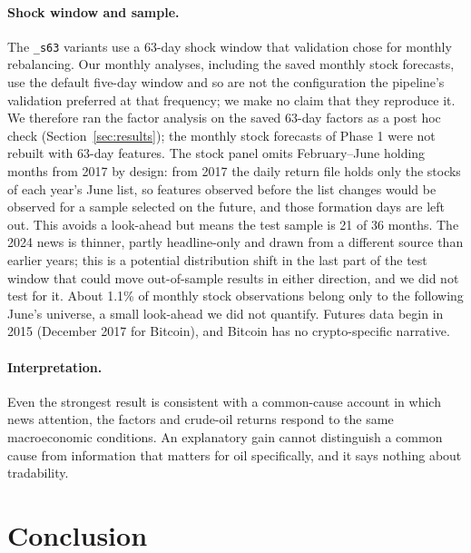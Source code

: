 \documentclass[11pt]{article}
\begin{document}
\paragraph{Shock window and sample.} The \texttt{\_s63} variants use a 63-day shock window that validation chose for monthly rebalancing. Our monthly analyses, including the saved monthly stock forecasts, use the default five-day window and so are not the configuration the pipeline's validation preferred at that frequency; we make no claim that they reproduce it. We therefore ran the factor analysis on the saved 63-day factors as a post hoc check (Section~\ref{sec:results}); the monthly stock forecasts of Phase 1 were not rebuilt with 63-day features. The stock panel omits February--June holding months from 2017 by design: from 2017 the daily return file holds only the stocks of each year's June list, so features observed before the list changes would be observed for a sample selected on the future, and those formation days are left out. This avoids a look-ahead but means the test sample is 21 of 36 months. The 2024 news is thinner, partly headline-only and drawn from a different source than earlier years; this is a potential distribution shift in the last part of the test window that could move out-of-sample results in either direction, and we did not test for it. About 1.1\% of monthly stock observations belong only to the following June's universe, a small look-ahead we did not quantify. Futures data begin in 2015 (December 2017 for Bitcoin), and Bitcoin has no crypto-specific narrative.

\paragraph{Interpretation.} Even the strongest result is consistent with a common-cause account in which news attention, the factors and crude-oil returns respond to the same macroeconomic conditions. An explanatory gain cannot distinguish a common cause from information that matters for oil specifically, and it says nothing about tradability.

\section{Conclusion}
\label{sec:conclusion}
\end{document}
